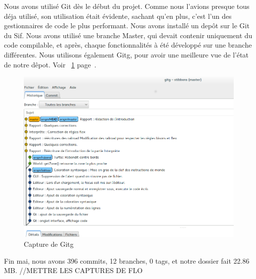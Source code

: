 Nous avons utilisé Git dès le début du projet. Comme nous l'avions presque tous déja utilisé, son utilisation était évidente, sachant qu'en plus, c'est l'un des gestionnaires de code le plus performant.
Nous avons installé un depôt sur le Git du Sif. Nous avons utilisé une branche Master, qui devait contenir uniquement du code compilable, et après, chaque fonctionnalités à été développé sur une branche différentes.
Nous utilisons également Gitg, pour avoir une meilleure vue de l'état de notre dêpot. Voir ~\ref{Gitg} page~\pageref{Gitg}.
\begin{figure}[h]
\caption{\label{Gitg} Capture de Gitg}
\includegraphics[scale=0.35]{doc/gestionProjet/gitbranche.png}
\end{figure}
Fin mai, nous avons 396 commits, 12 branches, 0 tags, et notre dossier fait 22.86 MB.
//METTRE LES CAPTURES DE FLO


